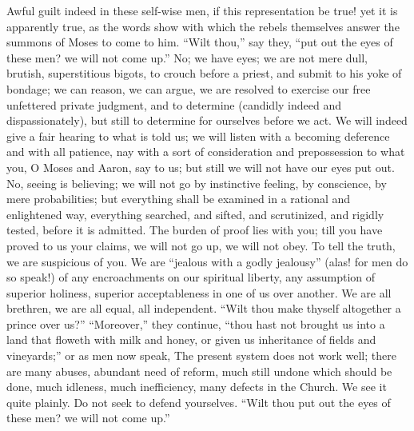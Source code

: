 Awful guilt indeed in these self-wise men, if this representation
be true! yet it is apparently true, as the words show with which the
rebels themselves answer the summons of Moses to come to him.
``Wilt thou,'' say they, ``put out the eyes of these men?
we will not come up.'' No; we have eyes; we are not mere dull,
brutish, superstitious bigots, to crouch before a priest, and submit
to his yoke of bondage; we can reason, we can argue, we are resolved
to exercise our free unfettered private judgment, and to determine
(candidly indeed and dispassionately), but still to determine for
ourselves before we act. We will indeed give a fair hearing to what is
told us; we will listen with a becoming deference and with all
patience, nay with a sort of consideration and prepossession to what
you, O Moses and Aaron, say to us; but still we will not have our eyes
put out. No, seeing is believing; we will not go by instinctive
feeling, by conscience, by mere probabilities; but everything shall be
examined in a rational and enlightened way, everything searched, and
sifted, and scrutinized, and rigidly tested, before it is admitted.
The burden of proof lies with you; till you have proved to us your
claims, we will not go up, we will not obey. To tell the truth, we are
suspicious of you. We are ``jealous with a godly jealousy''
(alas! for men do so speak!) of any encroachments on our spiritual
liberty, any assumption of superior holiness, superior acceptableness
in one of us over another. We are all brethren, we are all equal, all
independent. ``Wilt thou make thyself altogether a prince over
us?'' ``Moreover,'' they continue, ``thou hast not
brought us into a land that floweth with milk and honey, or given us
inheritance of fields and vineyards;'' or as men now speak, The
present system does not work well; there are many abuses, abundant
need of reform, much still undone which should be done, much idleness,
much inefficiency, many defects in the Church. We see it quite
plainly. Do not seek to defend yourselves. ``Wilt thou put out the
eyes of these men? we will not come up.''

